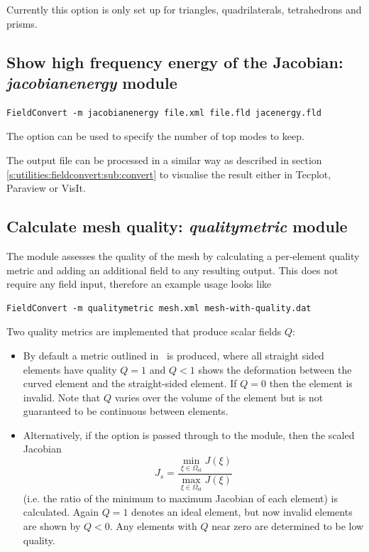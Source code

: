 \begin{notebox}
Currently this option is only set up for triangles, quadrilaterals,
 tetrahedrons and prisms.
\end{notebox}
%
%
%
%

\subsection{Show high frequency energy of the Jacobian: \textit{jacobianenergy} module}

\begin{lstlisting}[style=BashInputStyle]
FieldConvert -m jacobianenergy file.xml file.fld jacenergy.fld
\end{lstlisting}

The option  can be used to specify the number of top modes to
keep.

The output file  can be processed in a similar
way as described in section \ref{s:utilities:fieldconvert:sub:convert}
to visualise the result either in Tecplot, Paraview or VisIt.

\subsection{Calculate mesh quality: \textit{qualitymetric} module}

The  module assesses the quality of the mesh by calculating
a per-element quality metric and adding an additional field to any resulting
output. This does not require any field input, therefore an example usage looks
like

\begin{lstlisting}[style=BashInputStyle]
FieldConvert -m qualitymetric mesh.xml mesh-with-quality.dat
\end{lstlisting}

Two quality metrics are implemented that produce scalar fields $Q$:

\begin{itemize}
  \item By default a metric outlined in~\cite{GaRoPeSa15} is produced, where all
  straight sided elements have quality $Q = 1$ and $Q < 1$ shows the deformation
  between the curved element and the straight-sided element. If $Q = 0$ then the
  element is invalid. Note that $Q$ varies over the volume of the element but is
  not guaranteed to be continuous between elements.
  \item Alternatively, if the  option is passed through to the
  module, then the scaled Jacobian
  \[
    J_s =
    \frac{\min_{\xi\in\Omega_{\text{st}}}J(\xi)}{\max_{\xi\in\Omega_{\text{st}}}J(\xi)}
  \]
  (i.e. the ratio of the minimum to maximum Jacobian of each element) is
  calculated. Again $Q = 1$ denotes an ideal element, but now invalid elements
  are shown by $Q < 0$. Any elements with $Q$ near zero are determined to be low
  quality.
\end{itemize}


